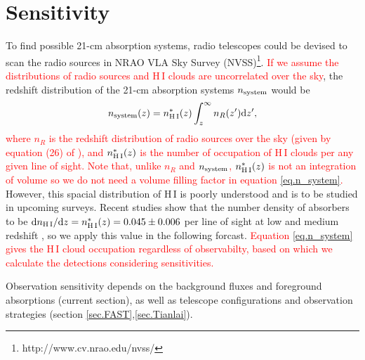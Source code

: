 \documentclass[]{raa}
\newcommand{\diff}{{\rm d}}
\newcommand{\HI}{{H{\small\,I}}}
\newcommand{\tcr}{\textcolor{red}}
\begin{document}
\section{Sensitivity}\label{sec.sensitivity}
To find possible 21-cm absorption systems, radio telescopes
could be devised to scan the radio sources in
NRAO VLA Sky Survey (NVSS)\footnote{http://www.cv.nrao.edu/nvss/}.
\tcr{If we assume the distributions of radio sources and
{\HI} clouds are uncorrelated over the sky}, the redshift
distribution of the 21-cm absorption systems $n_{\rm system}$ would be
\begin{equation}\label{eq.n_system}
    n_{\rm system}(z)=n_{\rm \HI}^*(z)\int_z^\infty n_R(z')\diff z',
\end{equation}
\tcr{where $n_R$ is the redshift distribution of radio sources over the sky
(given by equation (26) of \cite{2010A&ARv..18....1D}), and
$n_{\rm \HI}^*(z)$ is the number of occupation of {\HI} clouds
per any given line of sight. Note that, unlike $n_R$ and $n_{\rm system}$,
 $n_{\rm \HI}^*(z)$ is not an
integration of volume so we do not need a volume filling factor in
equation \ref{eq.n_system}.}
However, this spacial distribution of {\HI} is poorly understood and is to be
studied in upcoming surveys. Recent studies show that the number density of
absorbers to be $\diff n_{\rm \HI}/\diff z=n_{\rm \HI}^*(z)= 0.045\pm0.006$
per line of sight at low and medium redshift
\citep{2005ARA&A..43..861W,2007ASSP....3..501Z}, so we apply this value
in the following forcast. \tcr{Equation \ref{eq.n_system} gives the
{\HI} cloud occupation regardless of observabilty, based on which
we calculate the detections considering sensitivities.}

Observation sensitivity depends on the background fluxes and foreground
absorptions (current section), as well as telescope configurations and
observation strategies (section \ref{sec.FAST},\ref{sec.Tianlai}).
\end{document}
